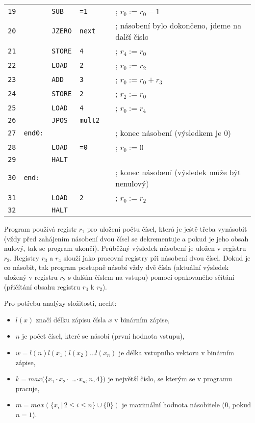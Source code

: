 \documentclass[10pt,a4paper]{article}
\newcommand{\st}[0]{\,|\,} %
\begin{document}
\begin{tabular}{llllll}
	\texttt{19} &       & \texttt{SUB}   & \texttt{=1}     &        & ; $r_{0} := r_{0} - 1$ \\
	\texttt{20} &       & \texttt{JZERO} & \texttt{next}   &	       & ; násobení bylo dokončeno, jdeme na další číslo \\
	\texttt{21} &       & \texttt{STORE} & \texttt{4}      &        & ; $r_{4} := r_{0}$ \\
	\texttt{22} &       & \texttt{LOAD}  & \texttt{2}      &        & ; $r_{0} := r_{2}$ \\
	\texttt{23} &       & \texttt{ADD}   & \texttt{3}      &        & ; $r_{0} := r_{0} + r_{3}$ \\
	\texttt{24} &       & \texttt{STORE} & \texttt{2}      &        & ; $r_{2} := r_{0}$ \\
	\texttt{25} &       & \texttt{LOAD}  & \texttt{4}      &        & ; $r_{0} := r_{4}$ \\
	\texttt{26} &       & \texttt{JPOS}  & \texttt{mult2}  &        & \\
	\texttt{27} & \texttt{end0:} &       &                 &        & ; konec násobení (výsledkem je 0) \\
	\texttt{28} &       & \texttt{LOAD}  & \texttt{=0}     &        & ; $r_{0} := 0$ \\
	\texttt{29} &       & \texttt{HALT}  &                 &        & \\
	\texttt{30} & \texttt{end:} &        &                 &        & ; konec násobení (výsledek může být nenulový) \\
	\texttt{31} &       & \texttt{LOAD}  & \texttt{2}      &        & ; $r_{0} := r_{2}$ \\
	\texttt{32} &       & \texttt{HALT}  &                 &        &
\end{tabular}
\vspace{0.5cm}

Program používá registr $r_{1}$ pro uložení počtu čísel, která je ještě třeba vynásobit (vždy před zahájením násobení dvou čísel se dekrementuje a pokud je jeho obsah nulový, tak se program ukončí). Průběžný výsledek násobení je uložen v registru $r_{2}$. Registry $r_{3}$ a $r_{4}$ slouží jako pracovní registry při násobení dvou čísel. Dokud je co násobit, tak program postupně násobí vždy dvě čísla (aktuální výsledek uložený v registru $r_{2}$ s dalším číslem na vstupu) pomocí opakovaného sčítání (přičítání obsahu registru $r_{3}$ k $r_{2}$).

Pro potřebu analýzy složitosti, nechť:
\begin{itemize}
	\item $l(x)$ značí délku zápisu čísla $x$ v binárním zápise,
	\item $n$ je počet čísel, které se násobí (první hodnota vstupu),
	\item $w = l(n)l(x_{1})l(x_{2})\dots l(x_{n})$ je délka vstupního vektoru v binárním zápise,
	\item $k = max(\{x_{1}\cdot x_{2}\cdot$ \dots $\cdot x_{n}, n, 4\})$ je největší číslo, se kterým se v programu pracuje,
	\item $m = max(\{x_{i} \st 2 \leq i \leq n\} \cup \{0\})$ je maximální hodnota násobitele (0, pokud $n = 1$).
\end{itemize}
\end{document}
